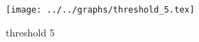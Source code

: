 \begin{figure}[h] \centering\texttt{[image: ../../graphs/threshold\_5.tex]}\caption{threshold 5}\label{gr:threshold_5} \end{figure}
